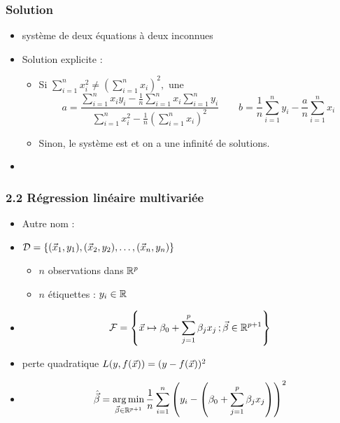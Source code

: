 \begin{frame}
  \frametitle{Solution}
  \begin{itemize}
  \item {} système de deux équations à deux inconnues
  \item[] Solution explicite : 
    \begin{itemize}
    \item Si $\sum_{i=1}^n x_i^2 \neq \left(\sum_{i=1}^n x_i\right)^2,$ une 
      \[ a = \frac{\sum_{i=1}^n x_i y_i - \frac1n \sum_{i=1}^n x_i \sum_{i=1}^n y_i}{
          \sum_{i=1}^n x_i^2 - \frac1n \left(\sum_{i=1}^n x_i\right)^2}  \hspace{2em}
        b = \frac1n \sum_{i=1}^n y_i - \frac{a}{n} \sum_{i=1}^n x_i\]
      \pause
    \item Sinon, le système est  et on a une infinité de solutions.
    \end{itemize}
  \pause
  \item {}
  \end{itemize}
\end{frame}

\begin{frame}
  \frametitle{2.2 Régression linéaire multivariée}
  \begin{itemize}
  \item Autre nom : 
  \item {} $\mathcal{D} = \{(\vec{x}_1, y_1), (\vec{x}_2, y_2), \dots, (\vec{x}_n, y_n)\}$
    \begin{itemize}
    \item $n$ observations dans ${\mathbb R}^p$ 
    \item $n$ étiquettes : $y_i \in {\mathbb R}$
    \end{itemize}
  \item {}
    \[\mathcal{F} = \left\{ \vec{x} \mapsto \beta_0 + \sum_{j=1}^p \beta_j x_j \, ;  \vec{\beta} \in {\mathbb R}^{p+1} \right\}\]
    \pause
    \vspace{-1em}
  \item {} perte quadratique $L(y, f(\vec{x})) = (y - f(\vec{x}))^2$
    \pause
  \item {}
    \[ \hat{\vec{\beta}} = \operatorname*{arg\,min}_{\vec{\beta} \in {\mathbb R}^{p+1}} \frac1n \sum_{i=1}^n \left(y_i - \left(\beta_0 + \sum_{j=1}^p \beta_j x_j\right)\right)^2 \]
  \end{itemize}
\end{frame}

